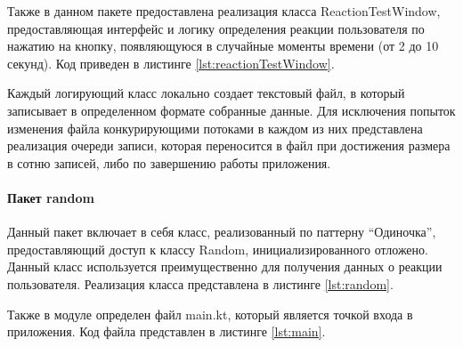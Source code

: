 







Также в данном пакете предоставлена реализация класса ReactionTestWindow, предоставляющая интерфейс и логику определения реакции пользователя по нажатию на кнопку, появляющуюся в случайные моменты времени (от 2 до 10 секунд). Код приведен в листинге \ref{lst:reactionTestWindow}.



Каждый логирующий класс локально создает текстовый файл, в который записывает в определенном формате собранные данные. Для исключения попыток изменения файла конкурирующими потоками в каждом из них представлена реализация очереди записи, которая переносится в файл при достижения размера в сотню записей, либо по завершению работы приложения.

\paragraph{Пакет random \newline}
Данный пакет включает в себя класс, реализованный по паттерну ``Одиночка'', предоставляющий доступ к классу Random, инициализированного отложено. Данный класс используется преимущественно для получения данных о реакции пользователя. Реализация класса представлена в листинге \ref{lst:random}.



Также в модуле определен файл main.kt, который является точкой входа в приложения. Код файла представлен в листинге \ref{lst:main}.

